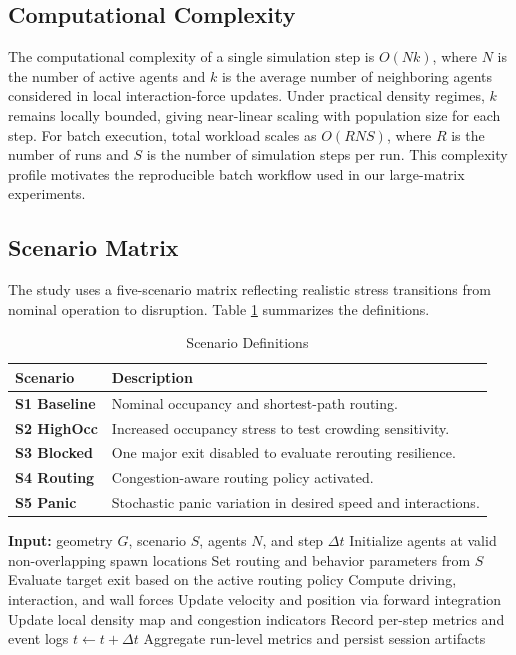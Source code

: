 \documentclass[journal]{IEEEtran}
\begin{document}
\subsection{Computational Complexity}
The computational complexity of a single simulation step is $O(Nk)$, where $N$ is the number of active agents and $k$ is the average number of neighboring agents considered in local interaction-force updates. Under practical density regimes, $k$ remains locally bounded, giving near-linear scaling with population size for each step. For batch execution, total workload scales as $O(RNS)$, where $R$ is the number of runs and $S$ is the number of simulation steps per run. This complexity profile motivates the reproducible batch workflow used in our large-matrix experiments.

\subsection{Scenario Matrix}
The study uses a five-scenario matrix reflecting realistic stress transitions from nominal operation to disruption. Table \ref{tab:scenarios} summarizes the definitions.

\begin{table}[t]
\centering
\caption{Scenario Definitions}
\label{tab:scenarios}
{\footnotesize
\setlength{\tabcolsep}{3pt}
\begin{tabular}{>{\bfseries}p{1.55cm} p{5.10cm}}
\toprule
Scenario & Description \\
\midrule
S1 Baseline & Nominal occupancy and shortest-path routing. \\
S2 HighOcc & Increased occupancy stress to test crowding sensitivity. \\
S3 Blocked & One major exit disabled to evaluate rerouting resilience. \\
S4 Routing & Congestion-aware routing policy activated. \\
S5 Panic & Stochastic panic variation in desired speed and interactions. \\
\bottomrule
\end{tabular}
}
\end{table}

\begin{algorithm}[t]
\caption{PeopleFlow Simulation Loop}
\label{alg:simloop}
\begin{algorithmic}[1]
\STATE \textbf{Input:} geometry $G$, scenario $S$, agents $N$, and step $\Delta t$
\STATE Initialize agents at valid non-overlapping spawn locations
\STATE Set routing and behavior parameters from $S$
        \STATE Evaluate target exit based on the active routing policy
        \STATE Compute driving, interaction, and wall forces
        \STATE Update velocity and position via forward integration
    \ENDFOR
    \STATE Update local density map and congestion indicators
    \STATE Record per-step metrics and event logs
    \STATE $t \leftarrow t + \Delta t$
\ENDWHILE
\STATE Aggregate run-level metrics and persist session artifacts
\end{algorithmic}
\end{algorithm}
\end{document}

